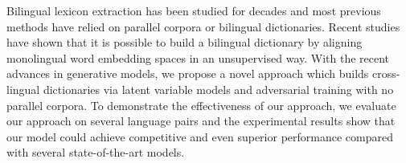Bilingual lexicon extraction has been studied for decades and most previous methods have relied on parallel corpora or bilingual dictionaries. Recent studies have shown that it is possible to build a bilingual dictionary by aligning monolingual word embedding spaces in an unsupervised way. With the recent advances in generative models, we propose a novel approach which builds cross-lingual dictionaries via latent variable models and adversarial training with no parallel corpora. To demonstrate the effectiveness of our approach, we evaluate our approach on several language pairs and the experimental results show that our model could achieve competitive and even superior performance compared with several state-of-the-art models.
